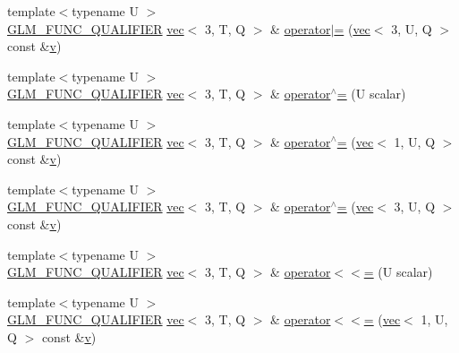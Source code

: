 \begin{DoxyCompactItemize}
\item 
{\footnotesize template$<$typename U $>$ }\\\hyperlink{setup_8hpp_a33fdea6f91c5f834105f7415e2a64407}{G\+L\+M\+\_\+\+F\+U\+N\+C\+\_\+\+Q\+U\+A\+L\+I\+F\+I\+ER} \hyperlink{structglm_1_1vec}{vec}$<$ 3, T, Q $>$ \& \hyperlink{structglm_1_1vec_3_013_00_01_t_00_01_q_01_4_a7294cce332c6969861099356e29fbaa3}{operator$\vert$=} (\hyperlink{structglm_1_1vec}{vec}$<$ 3, U, Q $>$ const \&\hyperlink{_s_d_l__opengl_8h_a10a82eabcb59d2fcd74acee063775f90}{v})
\item 
{\footnotesize template$<$typename U $>$ }\\\hyperlink{setup_8hpp_a33fdea6f91c5f834105f7415e2a64407}{G\+L\+M\+\_\+\+F\+U\+N\+C\+\_\+\+Q\+U\+A\+L\+I\+F\+I\+ER} \hyperlink{structglm_1_1vec}{vec}$<$ 3, T, Q $>$ \& \hyperlink{structglm_1_1vec_3_013_00_01_t_00_01_q_01_4_a81a4abd8c10a0585a35987317d6cb87f}{operator$^\wedge$=} (U scalar)
\item 
{\footnotesize template$<$typename U $>$ }\\\hyperlink{setup_8hpp_a33fdea6f91c5f834105f7415e2a64407}{G\+L\+M\+\_\+\+F\+U\+N\+C\+\_\+\+Q\+U\+A\+L\+I\+F\+I\+ER} \hyperlink{structglm_1_1vec}{vec}$<$ 3, T, Q $>$ \& \hyperlink{structglm_1_1vec_3_013_00_01_t_00_01_q_01_4_af7af47fbde4d53045b59d69a7563eba7}{operator$^\wedge$=} (\hyperlink{structglm_1_1vec}{vec}$<$ 1, U, Q $>$ const \&\hyperlink{_s_d_l__opengl_8h_a10a82eabcb59d2fcd74acee063775f90}{v})
\item 
{\footnotesize template$<$typename U $>$ }\\\hyperlink{setup_8hpp_a33fdea6f91c5f834105f7415e2a64407}{G\+L\+M\+\_\+\+F\+U\+N\+C\+\_\+\+Q\+U\+A\+L\+I\+F\+I\+ER} \hyperlink{structglm_1_1vec}{vec}$<$ 3, T, Q $>$ \& \hyperlink{structglm_1_1vec_3_013_00_01_t_00_01_q_01_4_abff32960a1defbf3301e8caa8c9fa1f6}{operator$^\wedge$=} (\hyperlink{structglm_1_1vec}{vec}$<$ 3, U, Q $>$ const \&\hyperlink{_s_d_l__opengl_8h_a10a82eabcb59d2fcd74acee063775f90}{v})
\item 
{\footnotesize template$<$typename U $>$ }\\\hyperlink{setup_8hpp_a33fdea6f91c5f834105f7415e2a64407}{G\+L\+M\+\_\+\+F\+U\+N\+C\+\_\+\+Q\+U\+A\+L\+I\+F\+I\+ER} \hyperlink{structglm_1_1vec}{vec}$<$ 3, T, Q $>$ \& \hyperlink{structglm_1_1vec_3_013_00_01_t_00_01_q_01_4_a473a7e56a46f30b068af234b3babd712}{operator$<$$<$=} (U scalar)
\item 
{\footnotesize template$<$typename U $>$ }\\\hyperlink{setup_8hpp_a33fdea6f91c5f834105f7415e2a64407}{G\+L\+M\+\_\+\+F\+U\+N\+C\+\_\+\+Q\+U\+A\+L\+I\+F\+I\+ER} \hyperlink{structglm_1_1vec}{vec}$<$ 3, T, Q $>$ \& \hyperlink{structglm_1_1vec_3_013_00_01_t_00_01_q_01_4_a4db1d87628b5f4ee744873e4affc61e5}{operator$<$$<$=} (\hyperlink{structglm_1_1vec}{vec}$<$ 1, U, Q $>$ const \&\hyperlink{_s_d_l__opengl_8h_a10a82eabcb59d2fcd74acee063775f90}{v})

\end{DoxyCompactItemize}
